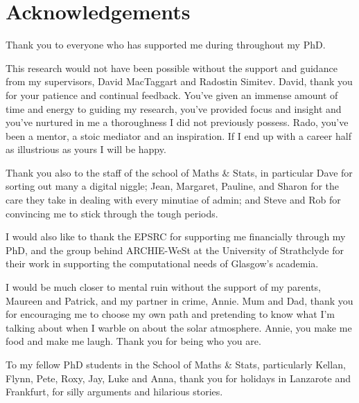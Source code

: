 \chapter{Acknowledgements}

Thank you to everyone who has supported me during throughout my PhD. 

\vspace{5mm}

This research would not have been possible without the support and guidance from my supervisors, David MacTaggart and Radostin Simitev. David, thank you for your patience and continual feedback. You've given an immense amount of time and energy to guiding my research, you've provided focus and insight and you've nurtured in me a thoroughness I did not previously possess. Rado, you've been a mentor, a stoic mediator and an inspiration. If I end up with a career half as illustrious as yours I will be happy.

Thank you also to the staff of the school of Maths \& Stats, in particular Dave for sorting out many a digital niggle; Jean, Margaret, Pauline, and Sharon for the care they take in dealing with every minutiae of admin; and Steve and Rob for convincing me to stick through the tough periods.

I would also like to thank the EPSRC for supporting me financially through my PhD, and the group behind ARCHIE-WeSt at the University of Strathclyde for their work in supporting the computational needs of Glasgow's academia.

\vspace{5mm}

I would be much closer to mental ruin without the support of my parents, Maureen and Patrick, and my partner in crime, Annie. Mum and Dad, thank you for encouraging me to choose my own path and pretending to know what I'm talking about when I warble on about the solar atmosphere. Annie, you make me food and make me laugh. Thank you for being who you are.

\vspace{5mm}

To my fellow PhD students in the School of Maths \& Stats, particularly Kellan, Flynn, Pete, Roxy, Jay, Luke and Anna, thank you for holidays in Lanzarote and Frankfurt, for silly arguments and hilarious stories.

